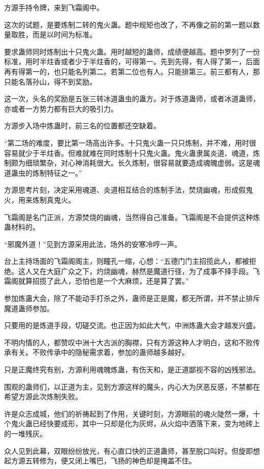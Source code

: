 \begin{this_body}
方源手持令牌，来到飞霜阁中。

这次的试题，是要炼制二转的鬼火蛊。题中规矩也改了，不再像之前的第一题以数量取胜，而是以时间为标准。

要求蛊师同时炼制出十只鬼火蛊。用时越短的蛊师，成绩便越高。题中罗列了一份标准，用时半炷香或者少于半炷香的，可得第一。先到先得，有人得了第一，后面再有得第一的，也只能名列第二。若第二位也有人。只能排第三。前三都有人，那只能名落孙山，得不到奖励。

这一次，头名的奖励是五张三转冰道蛊虫的蛊方。对于炼道蛊师，或者冰道蛊师，亦或者一方势力都有巨大的吸引力。

方源步入场中炼蛊时，前三名的位置都还空缺着。

“第二场的难度，要比第一场高出许多。十只鬼火蛊一只只炼制，并不难，用时很容易就少于半炷香。但难就难在同时炼制十只鬼火蛊。鬼火蛊隶属炎道、魂道，炼制颇为细琐繁杂，对心神消耗很大。长久炼制，很容易就要造成魂魄虚弱。这是魂道蛊虫的炼制特征之一。”

方源思考片刻，决定采用魂道、炎道相互结合的炼制手法，焚烧幽魂，形成假鬼火，用来炼制真鬼火。

飞霜阁是名门正派，方源焚烧的幽魂，当然得自己准备。飞霜阁是不会提供这种炼蛊材料的。

“邪魔外道！”见到方源采用此法，场外的安寒冷哼一声。

台上主持场面的飞霜阁阁主，则瞳孔一缩，心想：“五德门门主招揽此人，都被拒绝。这人又在大庭广众之下，灼烧幽魂，赫然是魔道行径，为了成事不择手段。飞霜阁就算招揽了此人，恐怕也是一个大麻烦，还是算了罢。”

参加炼蛊大会，除了不能动手打杀之外，蛊师是正是魔，都无所谓，并不禁止排斥魔道蛊师参加。

只要用的是炼道手段，切磋交流。也正因为如此大气，中洲炼蛊大会才越发兴盛。

不明内情的人，都赞叹中洲十大古派的胸襟，只有方源这种人才明白，这和不败传承有关。不败传承中的隐秘需求着，参加的蛊师越多越好。

只是正魔终究有别，方源利用魂魄炼蛊，有伤天和，是正道鄙视不容的凶残邪法。

围观的蛊师们，以正道为主，见到方源这样的魔头，内心大为厌恶反感，不禁都在希望方源此次炼制失败。

许是众志成城，他们的祈祷起到了作用，关键时刻，方源眼前的魂火陡然一爆，十个鬼火蛊已经快要成形，其中一只却是化为灰烬，从火焰中洒落下来，变为地砖上的一堆残灰。

众人见到此幕，双眼纷纷放光，有心直口快的正道蛊师，甚至脱口叫好。但旋即想起方源五转修为，便又闭上嘴巴，飞扬的神色却是掩盖不住。


\end{this_body}
